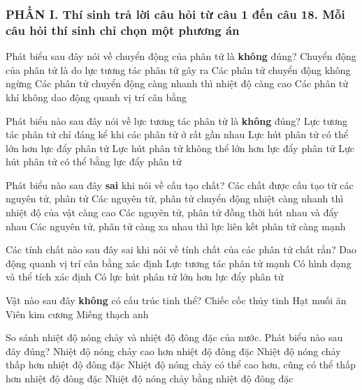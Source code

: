 \subsubsection*{PHẦN I. Thí sinh trả lời câu hỏi từ câu 1 đến câu 18. Mỗi câu hỏi thí sinh chỉ chọn một phương án}
\setcounter{ex}{0}
\begin{ex}
	Phát biểu sau đây nói về chuyển động của phân tử là \textbf{không} đúng?
	\choice
	{\True Chuyển động của phân tử là do lực tương tác phân tử gây ra}
	{Các phân tử chuyển động không ngừng}
	{Các phân tử chuyển động càng nhanh thì nhiệt độ càng cao}
	{Các phân tử khí không dao động quanh vị trí cân bằng}
	\loigiai{}
\end{ex}

\begin{ex}
	Phát biểu nào sau đây nói về lực tương tác phân tử là \textbf{không} đúng?
	\choice
	{Lực tương tác phân tử chỉ đáng kể khi các phân tử ở rất gần nhau}
	{Lực hút phân tử có thể lớn hơn lực đẩy phân tử}
	{\True Lực hút phân tử không thể lớn hơn lực đẩy phân tử}
	{Lực hút phân tử có thể bằng lực đẩy phân tử}
	\loigiai{}
\end{ex}

\begin{ex}
	Phát biểu nào sau đây \textbf{sai} khi nói về cấu tạo chất?
	\choice
	{Các chất được cấu tạo từ các nguyên tử, phân tử}
	{Các nguyên tử, phân tử chuyển động nhiệt càng nhanh thì nhiệt độ của vật càng cao}
	{Các nguyên tử, phân tử đồng thời hút nhau và đẩy nhau}
	{\True Các nguyên tử, phân tử càng xa nhau thì lực liên kết phân tử càng mạnh}
	\loigiai{}
\end{ex}

\begin{ex}
	Các tính chất nào sau đây sai khi nói về tính chất của các phân tử chất rắn?
	\choice
	{Dao động quanh vị trí cân bằng xác định}
	{Lực tương tác phân tử mạnh}
	{Có hình dạng và thể tích xác định}
	{\True Có lực hút phân tử lớn hơn lực đẩy phân tử}
	\loigiai{}
\end{ex}

\begin{ex}
	Vật nào sau đây \textbf{không} có cấu trúc tinh thể?
	\choice
	{\True Chiếc cốc thủy tinh}
	{Hạt muối ăn}
	{Viên kim cương}
	{Miếng thạch anh}
	\loigiai{}
\end{ex}

\begin{ex}
	So sánh nhiệt độ nóng chảy và nhiệt độ đông đặc của nước. Phát biểu nào sau đây đúng?
	\choice
	{Nhiệt độ nóng chảy cao hơn nhiệt độ đông đặc}
	{Nhiệt độ nóng chảy thấp hơn nhiệt độ đông đặc}
	{Nhiệt độ nóng chảy có thể cao hơn, cũng có thể thấp hơn nhiệt độ đông đặc}
	{\True Nhiệt độ nóng chảy bằng nhiệt độ đông đặc}
	\loigiai{}
\end{ex}

